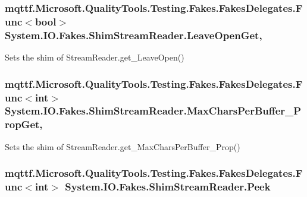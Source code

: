 \hypertarget{class_system_1_1_i_o_1_1_fakes_1_1_shim_stream_reader_a733b7e6580337900b3d1af7522249e22}{
\subsubsection[{Leave\-Open\-Get}]{\setlength{\rightskip}{0pt plus 5cm}mqttf.\-Microsoft.\-Quality\-Tools.\-Testing.\-Fakes.\-Fakes\-Delegates.\-Func$<$bool$>$ System.\-I\-O.\-Fakes.\-Shim\-Stream\-Reader.\-Leave\-Open\-Get\hspace{0.3cm}{\ttfamily [get]}, {\ttfamily [set]}}}\label{class_system_1_1_i_o_1_1_fakes_1_1_shim_stream_reader_a733b7e6580337900b3d1af7522249e22}


Sets the shim of Stream\-Reader.\-get\-\_\-\-Leave\-Open()

\hypertarget{class_system_1_1_i_o_1_1_fakes_1_1_shim_stream_reader_ab1aeff9cde4c36edfc82b1e42841865d}{
\subsubsection[{Max\-Chars\-Per\-Buffer\-\_\-\-Prop\-Get}]{\setlength{\rightskip}{0pt plus 5cm}mqttf.\-Microsoft.\-Quality\-Tools.\-Testing.\-Fakes.\-Fakes\-Delegates.\-Func$<$int$>$ System.\-I\-O.\-Fakes.\-Shim\-Stream\-Reader.\-Max\-Chars\-Per\-Buffer\-\_\-\-Prop\-Get\hspace{0.3cm}{\ttfamily [get]}, {\ttfamily [set]}}}\label{class_system_1_1_i_o_1_1_fakes_1_1_shim_stream_reader_ab1aeff9cde4c36edfc82b1e42841865d}


Sets the shim of Stream\-Reader.\-get\-\_\-\-Max\-Chars\-Per\-Buffer\-\_\-\-Prop()

\hypertarget{class_system_1_1_i_o_1_1_fakes_1_1_shim_stream_reader_ab4b4ff691b237aaebfd037f5a3f255af}{
\subsubsection[{Peek}]{\setlength{\rightskip}{0pt plus 5cm}mqttf.\-Microsoft.\-Quality\-Tools.\-Testing.\-Fakes.\-Fakes\-Delegates.\-Func$<$int$>$ System.\-I\-O.\-Fakes.\-Shim\-Stream\-Reader.\-Peek\hspace{0.3cm}{\ttfamily [set]}}}\label{class_system_1_1_i_o_1_1_fakes_1_1_shim_stream_reader_ab4b4ff691b237aaebfd037f5a3f255af}


